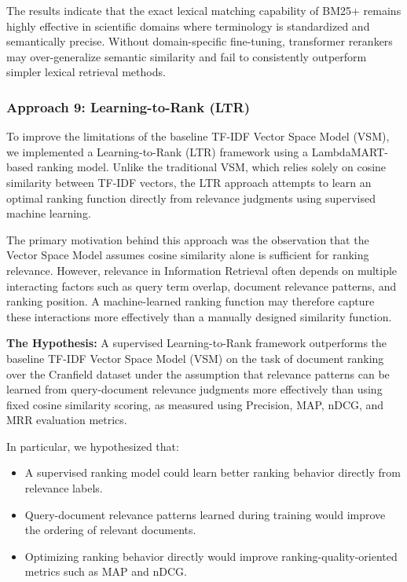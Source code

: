 \documentclass{article}
\begin{document}
The results indicate that the exact lexical matching capability of BM25+ remains highly effective in scientific domains where terminology is standardized and semantically precise. Without domain-specific fine-tuning, transformer rerankers may over-generalize semantic similarity and fail to consistently outperform simpler lexical retrieval methods.

\subsubsection{Approach 9: Learning-to-Rank (LTR)}

To improve the limitations of the baseline TF-IDF Vector Space Model (VSM), we implemented a Learning-to-Rank (LTR) framework using a LambdaMART-based ranking model. Unlike the traditional VSM, which relies solely on cosine similarity between TF-IDF vectors, the LTR approach attempts to learn an optimal ranking function directly from relevance judgments using supervised machine learning.

The primary motivation behind this approach was the observation that the Vector Space Model assumes cosine similarity alone is sufficient for ranking relevance. However, relevance in Information Retrieval often depends on multiple interacting factors such as query term overlap, document relevance patterns, and ranking position. A machine-learned ranking function may therefore capture these interactions more effectively than a manually designed similarity function.

\textbf{The Hypothesis:} A supervised Learning-to-Rank framework outperforms the baseline TF-IDF Vector Space Model (VSM) on the task of document ranking over the Cranfield dataset under the assumption that relevance patterns can be learned from query-document relevance judgments more effectively than using fixed cosine similarity scoring, as measured using Precision, MAP, nDCG, and MRR evaluation metrics.

In particular, we hypothesized that:
\begin{itemize}
    \item A supervised ranking model could learn better ranking behavior directly from relevance labels.
    \item Query-document relevance patterns learned during training would improve the ordering of relevant documents.
    \item Optimizing ranking behavior directly would improve ranking-quality-oriented metrics such as MAP and nDCG.
\end{itemize}
\end{document}
